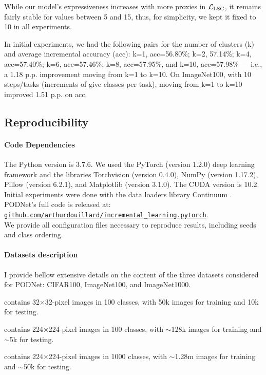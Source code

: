 While our model's expressiveness increases with more proxies in $\mathcal{L}_\text{LSC}$, it remains fairly
stable for values between 5 and 15, thus, for simplicity, we kept it fixed to 10 in all experiments.

In initial experiments, we had the following pairs for the number of clusters (k) and average
incremental accuracy (acc): k=1, acc=56.80\%; k=2, 57.14\%; k=4, acc=57.40\%; k=6, acc=57.46\%; k=8,
acc=57.95\%, and k=10, acc=57.98\% --- i.e., a 1.18 p.p. improvement moving from k=1 to k=10. On
ImageNet100, with 10 steps/tasks (increments of give classes per task), moving from k=1 to k=10
improved 1.51 p.p. on acc.

\subsection{Reproducibility}

\paragraph{Code Dependencies} The Python version is  3.7.6. We used the PyTorch
\cite{paszke2017pytorch} (version 1.2.0) deep learning framework and the libraries Torchvision
(version 0.4.0), NumPy \cite{oliphant2006numpy} (version 1.17.2), Pillow (version 6.2.1), and
Matplotlib \cite{hunter2007matplotlib} (version 3.1.0). The CUDA version is 10.2. Initial
experiments were done with the data loaders library Continuum \cite{douillardlesort2020continuum}.
PODNet's full code is released at:\\
\href{https://github.com/arthurdouillard/incremental\_learning.pytorch}{\texttt{github.com/arthurdouillard/incremental\_learning.pytorch}}.
\\We provide all configuration files necessary to reproduce results, including seeds and class
ordering.

\paragraph{Datasets description} I provide bellow extensive details on the content of the three
datasets considered for PODNet: CIFAR100, ImageNet100, and ImageNet1000.

{\begin{description} \setlength{\parskip}{0pt}
      \item[CIFAR100] contains 32$\times$32-pixel images in 100 classes, with 50k images for training
            and 10k for testing.
      \item[ImageNet100] contains 224$\times$224-pixel images in 100 classes, with $\sim$128k images
            for training and $\sim$5k for testing.
      \item[ImageNet1000] contains 224$\times$224-pixel images in 1000 classes, with $\sim$1.28m
            images for training and $\sim$50k for testing. \end{description}}

